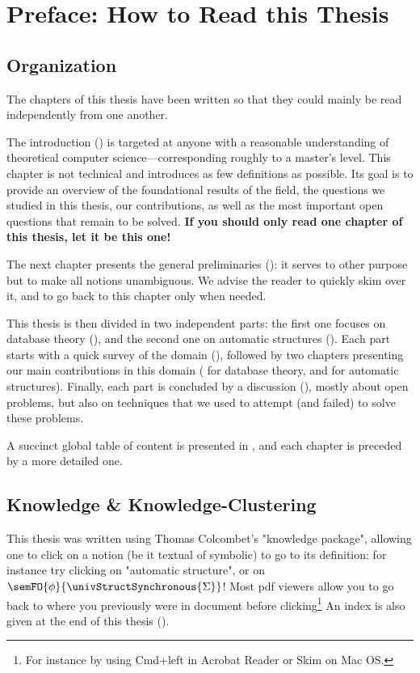 \chapter*{Preface: How to Read this Thesis}

\section*{Organization}

The chapters of this thesis have been written so that they could mainly
be read independently from one another.

The introduction () is targeted at anyone with
a reasonable understanding of theoretical computer science---corresponding roughly
to a master's level. This chapter is not technical and introduces as few definitions
as possible. Its goal is to provide an overview of the foundational results of the
field, the questions we studied in this thesis, our contributions, as well
as the most important open questions that remain to be solved.
\textbf{If you should only read one chapter of this thesis, let it be this one!}

The next chapter presents the general preliminaries ():
it serves to other purpose but to make all notions unambiguous. We advise
the reader to quickly skim over it, and to go back to this chapter only when
needed.

This thesis is then divided in two independent parts:
the first one focuses on database theory (),
and the second one on automatic structures ().
Each part starts with a quick survey of the domain
(),
followed by two chapters presenting our main contributions in this domain
( for database theory,
and  for automatic structures).
Finally, each part is concluded by a discussion (),
mostly about open problems, but also on techniques that we used to attempt (and failed) to solve these problems.

A succinct global table of content is presented in ,
and each chapter is preceded by a more detailed one.

\section*{Knowledge \& Knowledge-Clustering}
This thesis was written using Thomas Colcombet's "knowledge package", allowing
one to click on a notion (be it textual of symbolic) to go to its definition:
for instance try clicking on "automatic structure", or on
$\semFO{\phi}{\univStructSynchronous{\Sigma}}$!
Most pdf viewers allow you to go back to where you previously were
in document before clicking\footnote{For instance
by using Cmd+left in Acrobat Reader or Skim on Mac OS.}
An index is also given at the end of this thesis ().

